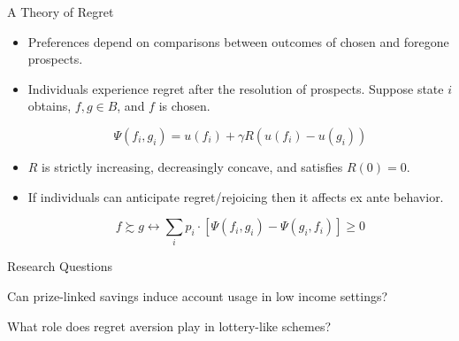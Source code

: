 \documentclass[aspectratio=169]{beamer}
\newenvironment{wideenumerate}{\enumerate\addtolength{\itemsep}{10pt}}{\endenumerate}
\begin{document}

\begin{frame}{A Theory of Regret}

	\begin{itemize}

		\item Preferences depend on comparisons between outcomes of chosen and foregone prospects.

		\item Individuals experience regret after the resolution of prospects. Suppose state $i$ obtains, $f, g \in B$, and $f$ is chosen.

			\[ \Psi(f_i, g_i) = u(f_i) + \gamma R(u(f_i) - u(g_i)) \]

		\item $R$ is strictly increasing, decreasingly concave, and satisfies $R(0) = 0$.

		\item If individuals can anticipate regret/rejoicing then it affects ex ante behavior.

		\[ f \succsim g \leftrightarrow \sum_i p_{i} \cdot [\Psi(f_i, g_i) - \Psi(g_i, f_i)] \geq 0 \]




	\end{itemize}
	
\end{frame}

\begin{frame}{Research Questions}

	\begin{wideenumerate}

		\item Can prize-linked savings induce account usage in low income settings?
		\item What role does regret aversion play in lottery-like schemes?

	\end{wideenumerate}

\end{frame}
\end{document}
